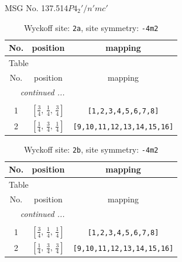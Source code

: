 \documentclass[fleqn,8pt]{jsarticle}
\begin{document}
\setcounter{MaxMatrixCols}{32}

\renewcommand{\tablename}{Table~}
\renewcommand{\figurename}{Figure~}
\begin{center}
\LARGE
MSG No. 137.514\quad$P4_{2}'/n'mc'$
\end{center}
\renewcommand{\arraystretch}{1.2}
\begin{longtable}{ccc}
\caption{Wyckoff site: {\tt 2a}, site symmetry: {\tt -4m2}}
 \\
 \hline \hline
No. & position & mapping \\ \hline \endfirsthead

\multicolumn{2}{l}{\tablename\ \thetable{}} \\
 \hline \hline
No. & position & mapping \\ \hline \endhead

 \hline \hline
\multicolumn{2}{r}{\footnotesize\it continued ...} \\ \endfoot

 \hline \hline
\multicolumn{2}{r}{} \\ \endlastfoot

1 & $\left[ \frac{3}{4},\, \frac{1}{4},\, \frac{3}{4} \right]$ & {\tt [1,2,3,4,5,6,7,8]} \\ \hline
2 & $\left[ \frac{1}{4},\, \frac{3}{4},\, \frac{1}{4} \right]$ & {\tt [9,10,11,12,13,14,15,16]} \\
\end{longtable}
\renewcommand{\arraystretch}{1.2}
\begin{longtable}{ccc}
\caption{Wyckoff site: {\tt 2b}, site symmetry: {\tt -4m2}}
 \\
 \hline \hline
No. & position & mapping \\ \hline \endfirsthead

\multicolumn{2}{l}{\tablename\ \thetable{}} \\
 \hline \hline
No. & position & mapping \\ \hline \endhead

 \hline \hline
\multicolumn{2}{r}{\footnotesize\it continued ...} \\ \endfoot

 \hline \hline
\multicolumn{2}{r}{} \\ \endlastfoot

1 & $\left[ \frac{3}{4},\, \frac{1}{4},\, \frac{1}{4} \right]$ & {\tt [1,2,3,4,5,6,7,8]} \\ \hline
2 & $\left[ \frac{1}{4},\, \frac{3}{4},\, \frac{3}{4} \right]$ & {\tt [9,10,11,12,13,14,15,16]} \\
\end{longtable}
\end{document}
